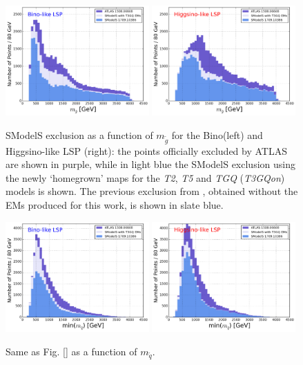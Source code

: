 \documentclass[a4paper,11pt]{article}
\newcommand{\MSQ}{$ m _{ \tilde q } $\xspace}
\newcommand{\MGLU}{$ m _{ \tilde g } $\xspace}
\begin{document}
\begin{figure}[!]
\begin{center}
\subfigure
\includegraphics[width=0.49\textwidth]{PLOTS/Bino_Comparison_Gluino.png}
\subfigure
{\includegraphics[width=0.49\textwidth]{PLOTS/Higgsino_Comparison_Gluino.png}}
\end{center}
\caption{SModelS exclusion as a function of \MGLU for the Bino(left) and Higgsino-like LSP (right): the points officially excluded by ATLAS are shown in purple, while in light blue the SModelS exclusion using the newly `homegrown' maps for the \textit{T2}, \textit{T5} and \textit{TGQ} (\textit{T3GQon}) models is shown. The previous exclusion from \cite{Ambrogi:2017lov}, obtained without the EMs produced for this work, is shown in slate blue.} 
\label{pmssm_new_exclusion_gluino}
\end{figure}
%
\begin{figure}[!]
\begin{center}
\subfigure
\includegraphics[width=0.49\textwidth]{PLOTS/Bino_Comparison_Squark.png}
\subfigure
{\includegraphics[width=0.49\textwidth]{PLOTS/Higgsino_Comparison_Squark.png}}
\end{center}
\caption{Same as Fig. \ref{} as a function of \MSQ.} 
\label{pmssm_new_exclusion_squark}
\end{figure}
\end{document}
